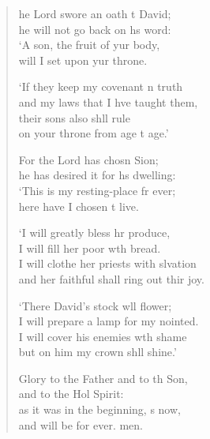 \settowidth{\versewidth}{I will clothe her priests with salvation *}
\begin{verse}%
  \begin{patverse}
he Lord swore an oath t David;\Med\\
    he will not go back on h\pointup{\i}s word:\\
‘A son, the fruit of yur body,\Med\\
    will I set upon yur throne.

‘If they keep my covenant \pointup{\i}n truth\Med\\
    and my laws that I hve taught them,\\
their sons also shll rule\Med\\
    on your throne from age t age.’

For the Lord has chosn Sion;\Med\\
    he has desired it for h\pointup{\i}s dwelling:\\
‘This is my resting-place fr ever;\Med\\
    here have I chosen t live.

‘I will greatly bless hr produce,\Med\\
    I will fill her poor w\pointup{\i}th bread.\\
I will clothe her priests with slvation\Med\\
    and her faithful shall ring out thir joy.

‘There David’s stock w\pointup{\i}ll flower;\Med\\
    I will prepare a lamp for my nointed.\\
I will cover his enemies w\pointup{\i}th shame\Med\\
    but on him my crown shll shine.’

Glory to the Father and to th Son,\Med\\
    and to the Hol Spirit:\\
as it was in the beginning, \pointup{\i}s now,\Med\\
    and will be for ever. men.
  \end{patverse}
\end{verse}
